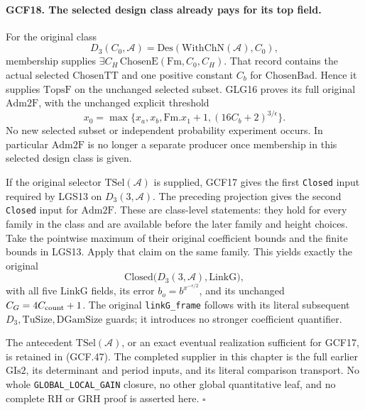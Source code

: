 \documentclass[11pt,a4paper]{article}
\numberwithin{equation}{section}
\theoremstyle{remark}\newtheorem{remark}[theorem]{Remark}
\begin{document}
\paragraph{GCF18. The selected design class already pays for its top field.}
\label{claim:GCF18}
For the original class
\[
 D_3(C_0,\mathcal A)=\mathrm{Des}(\mathrm{WithChN}(\mathcal A),C_0),
\]
membership supplies \(\exists C_H\,\mathrm{ChosenE}(\mathrm{Fm},C_0,C_H)\).
That record contains the actual selected \(\mathrm{ChosenTT}\)
and one positive constant \(C_b\) for \(\mathrm{ChosenBad}\).
Hence it supplies \(\mathrm{TopsF}\) on the unchanged selected
subset.  GLG16 proves its full original \(\mathrm{Adm2F}\), with
the unchanged explicit threshold
\[
 x_0=\max\{x_a,x_b,\mathrm{Fm}.x_1+1,
                              (16C_b+2)^{3/\epsilon}\}.
 \tag{GCF.46}
\]
No new selected subset or independent probability experiment occurs.
In particular \(\mathrm{Adm2F}\) is no longer a separate producer
once membership in this selected design class is given.

If the original selector \(\mathrm{TSel}(\mathcal A)\) is
supplied, GCF17 gives the first \texttt{Closed} input required by
LGS13 on \(D_3(3,\mathcal A)\).  The preceding projection gives
the second \texttt{Closed} input for \(\mathrm{Adm2F}\).
These are class-level statements: they hold for every family in the
class and are available before the later family and height choices.
Take the pointwise maximum of their original coefficient bounds and
the finite bounds in LGS13.  Apply that claim on the same family.
This yields exactly the original
\[
 \mathrm{Closed}\bigl(D_3(3,\mathcal A),\mathrm{LinkG}\bigr),
 \tag{GCF.47}
\]
with all five \(\mathrm{LinkG}\) fields, its error
\(b_o=b^{x^{-\epsilon/2}}\), and its unchanged
\(C_G=4C_{\rm count}+1\).  The original
\texttt{link\allowbreak G\_\allowbreak frame} follows with its literal subsequent
\(D_3,\mathrm{TuSize},\mathrm{DGamSize}\) guards; it introduces
no stronger coefficient quantifier.

The antecedent \(\mathrm{TSel}(\mathcal A)\), or an exact eventual
realization sufficient for GCF17, is retained in (GCF.47).
The completed supplier in this chapter is the full earlier
\(\mathrm{GIs2}\), its determinant and period inputs, and its
literal comparison transport.  No whole \texttt{GLOBAL\_\allowbreak LOCAL\_\allowbreak GAIN}
closure, no other global quantitative leaf, and no complete RH or GRH
proof is asserted here.
\hfill\(\square\)

\endgroup
\end{document}

